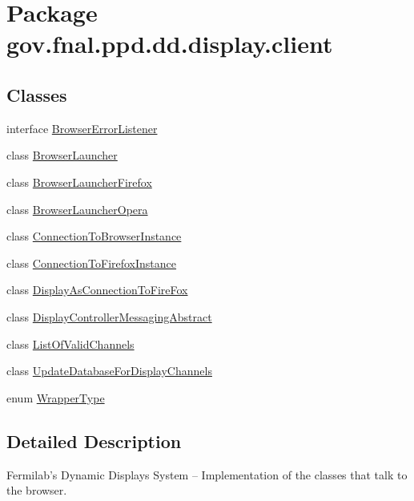 \hypertarget{namespacegov_1_1fnal_1_1ppd_1_1dd_1_1display_1_1client}{\section{Package gov.\-fnal.\-ppd.\-dd.\-display.\-client}
\label{namespacegov_1_1fnal_1_1ppd_1_1dd_1_1display_1_1client}
}
\subsection*{Classes}
\begin{DoxyCompactItemize}
\item 
interface \hyperlink{interfacegov_1_1fnal_1_1ppd_1_1dd_1_1display_1_1client_1_1BrowserErrorListener}{Browser\-Error\-Listener}
\item 
class \hyperlink{classgov_1_1fnal_1_1ppd_1_1dd_1_1display_1_1client_1_1BrowserLauncher}{Browser\-Launcher}
\item 
class \hyperlink{classgov_1_1fnal_1_1ppd_1_1dd_1_1display_1_1client_1_1BrowserLauncherFirefox}{Browser\-Launcher\-Firefox}
\item 
class \hyperlink{classgov_1_1fnal_1_1ppd_1_1dd_1_1display_1_1client_1_1BrowserLauncherOpera}{Browser\-Launcher\-Opera}
\item 
class \hyperlink{classgov_1_1fnal_1_1ppd_1_1dd_1_1display_1_1client_1_1ConnectionToBrowserInstance}{Connection\-To\-Browser\-Instance}
\item 
class \hyperlink{classgov_1_1fnal_1_1ppd_1_1dd_1_1display_1_1client_1_1ConnectionToFirefoxInstance}{Connection\-To\-Firefox\-Instance}
\item 
class \hyperlink{classgov_1_1fnal_1_1ppd_1_1dd_1_1display_1_1client_1_1DisplayAsConnectionToFireFox}{Display\-As\-Connection\-To\-Fire\-Fox}
\item 
class \hyperlink{classgov_1_1fnal_1_1ppd_1_1dd_1_1display_1_1client_1_1DisplayControllerMessagingAbstract}{Display\-Controller\-Messaging\-Abstract}
\item 
class \hyperlink{classgov_1_1fnal_1_1ppd_1_1dd_1_1display_1_1client_1_1ListOfValidChannels}{List\-Of\-Valid\-Channels}
\item 
class \hyperlink{classgov_1_1fnal_1_1ppd_1_1dd_1_1display_1_1client_1_1UpdateDatabaseForDisplayChannels}{Update\-Database\-For\-Display\-Channels}
\item 
enum \hyperlink{enumgov_1_1fnal_1_1ppd_1_1dd_1_1display_1_1client_1_1WrapperType}{Wrapper\-Type}
\end{DoxyCompactItemize}


\subsection{Detailed Description}
Fermilab's Dynamic Displays System -- Implementation of the classes that talk to the browser.